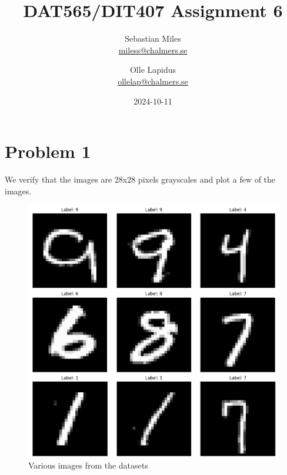 \documentclass[a4paper]{article}
\begin{document}
\author{
  Sebastian Miles \\
  \href{mailto:miless@chalmers.se}{miless@chalmers.se}
  \and
  Olle Lapidus \\
  \href{mailto:ollelap@chalmers.se}{ollelap@chalmers.se}
}
\title{DAT565/DIT407 Assignment 6}
\date{2024-10-11}

\maketitle
\section*{Problem 1}
We verify that the images are 28x28 pixels grayscales and plot a few of the images.
\begin{figure}[H]
	\begin{center}
		\includegraphics[scale=0.4]{datasets.png}
		\caption{Various images from the datasets}
		\label{hist}
	\end{center}
\end{figure}
\end{document}
